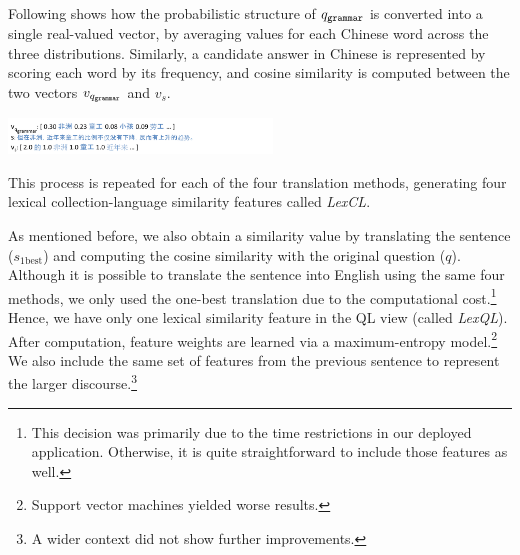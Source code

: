 \documentclass{sig-alternate-05-2015}
\begin{document}
Following shows how the probabilistic structure of $q_{{\tt grammar}}$ is converted into a single real-valued vector,
by averaging values for each Chinese word across the three distributions.
Similarly, a candidate answer in Chinese is represented by scoring each word by its frequency, and cosine similarity
is computed between the two vectors $v_{q_{{\tt grammar}}}$ and $v_s$.

\vspace{-0.1cm}
\includegraphics[width=7cm]{example2.pdf}

This process is repeated for each of the four translation methods, generating four lexical collection-language similarity features 
called \emph{LexCL}.


As mentioned before, we also obtain a similarity value by translating the sentence ($s_{\textrm{1best}}$) 
and computing the cosine similarity with the original question ($q$). Although it is possible to translate the 
sentence into English using the same four methods, we only used the one-best translation due to the computational 
cost.\footnote{This decision was primarily due to the time restrictions in our deployed application. Otherwise, it is
quite straightforward to include those features as well.} Hence, we have only one lexical similarity feature in the QL 
view (called \emph{LexQL}).
After computation, feature weights are learned via a maximum-entropy model.\footnote{Support vector machines 
yielded worse results.} We also include the 
same set of features from the previous sentence to represent the larger discourse.\footnote{A wider context did not
show further improvements.}
\end{document}
